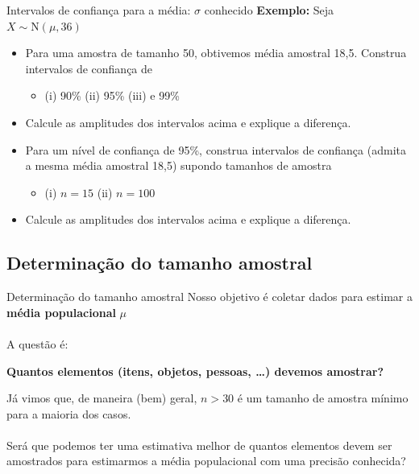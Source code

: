 \documentclass[10pt]{beamer}\usepackage[]{graphicx}\usepackage[]{color}
\providecommand{\N}{\text{N}}
\theoremstyle{definition}
\begin{document}
\begin{frame}{Intervalos de confiança para a média: $\sigma$ conhecido}
  \textbf{Exemplo:} Seja $X \sim \N(\mu, 36)$
  \begin{itemize}
  \item[a)] Para uma amostra de tamanho 50, obtivemos média amostral
    18,5. Construa intervalos de confiança de
    \begin{itemize}
    \item[] (i) 90\% \quad (ii) 95\% \quad (iii) e 99\%
    \end{itemize}
  \item[b)] Calcule as amplitudes dos intervalos acima e explique a
    diferença.
  \item[c)] Para um nível de confiança de 95\%, construa intervalos de
    confiança (admita a mesma média amostral 18,5) supondo tamanhos de
    amostra
    \begin{itemize}
    \item[] (i) $n = 15$ \quad (ii) $n = 100$
    \end{itemize}
  \item[d)] Calcule as amplitudes dos intervalos acima e explique a
    diferença.
  \end{itemize}
\end{frame}

\subsection{Determinação do tamanho amostral}

\begin{frame}{Determinação do tamanho amostral}
  Nosso objetivo é coletar dados para estimar a \textbf{média
    populacional} $\mu$ \\~\\
  A questão é:
  \begin{center}
    \textbf{Quantos elementos (itens, objetos, pessoas, \ldots) devemos
      amostrar?}
  \end{center}
  \vspace{1em}
  Já vimos que, de maneira (bem) geral, $n>30$ é um tamanho de amostra
  mínimo para a maioria dos casos. \\~\\
  Será que podemos ter uma estimativa melhor de quantos elementos
  devem ser amostrados para estimarmos a média populacional com uma
  precisão conhecida?
\end{frame}
\end{document}
